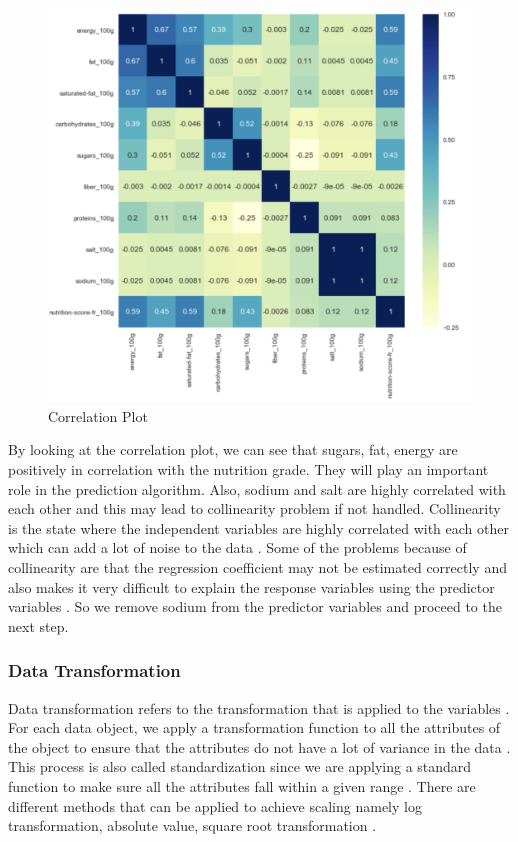 \documentclass[sigconf]{acmart}
\begin{document}
\begin{figure}
\includegraphics[width=1.0\columnwidth]{images/fig3.png}
\caption{Correlation Plot \cite{code-base}}
\label{fig:Fig3}
\end{figure}

By looking at the correlation plot, we can see that sugars, fat, energy are positively in correlation with the nutrition grade. They will play an important role in the prediction algorithm. Also, sodium and salt are highly correlated with each other and this may lead to collinearity problem if not handled. Collinearity is the state where the independent variables are highly correlated with each other which can add a lot of noise to the data \cite{www-coll}. Some of the problems because of collinearity are that the regression coefficient may not be estimated correctly and also makes it very difficult to explain the response variables using the predictor variables \cite{www-coll}. So we remove sodium from the predictor variables and proceed to the next step.

\subsubsection{Data Transformation} 
Data transformation refers to the transformation that is applied to the variables \cite{book-tan}. For each data object, we apply a transformation function to all the attributes of the object to ensure that the attributes do not have a lot of variance in the data \cite{book-tan}. This process is also called standardization since we are applying a standard function to make sure all the attributes fall within a given range \cite{book-tan}. There are different methods that can be applied to achieve scaling namely log transformation, absolute value, square root transformation \cite{book-tan}. \\
\end{document}

